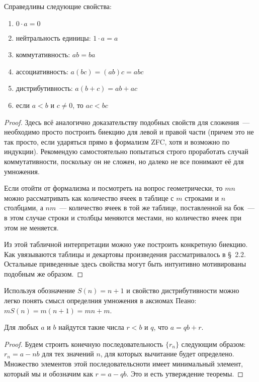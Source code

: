 \begin{thm}
Справедливы следующие свойства:
\begin{enumerate}
\item $0\cdot a = 0$
\item нейтральность единицы: $1\cdot a = a$
\item коммутативность: $ab = ba$
\item ассоциативность: $a(bc) = (ab)c = abc$
\item дистрибутивность: $a(b+c) = ab + ac$
\item если $a < b$ и $c \not= 0$, то $ac < bc$
\end{enumerate}
\end{thm}
\begin{proof}
Здесь всё аналогично доказательству подобных свойств для сложения~--- необходимо просто построить биекцию для левой и правой части (причем это не так просто, если ударяться прямо в формализм ZFC, хотя и возможно по индукции). Рекомендую самостоятельно попытаться строго проработать случай коммутативности, поскольку он не сложен, но далеко не все понимают её для умножения.

Если отойти от формализма и посмотреть на вопрос геометрически, то $mn$ можно рассматривать как количество ячеек в таблице с $m$ строками и $n$ столбцами, а $nm$~--- количество ячеек в той же таблице, поставленной на бок~--- в этом случае строки и столбцы меняются местами, но количество ячеек при этом не меняется.

Из этой табличной интерпретации можно уже построить конкретную биекцию. Как увязываются таблицы и декартовы произведения рассматривалось в \S~2.2. Остальные приведенные здесь свойства могут быть интуитивно мотивированы подобным же образом.
\end{proof}

Используя обозначение $S(n) = n+1$ и свойство дистрибутивности можно легко понять смысл определния умножения в аксиомах Пеано: $mS(n) = m(n+1) = mn + m$.

\begin{thm}
Для любых $a$ и $b$ найдутся такие числа $r<b$ и $q$, что $a = qb + r$.
\end{thm}
\begin{proof}
Будем строить конечную последовательность $\{r_n\}$ следующим образом: $r_n = a - nb$ для тех значений $n$, для которых вычитание будет определено. Множество элементов этой последовательсноти имеет минимальный элемент, который мы и обозначим как $r = a - qb$. Это и есть утверждение теоремы.
\end{proof}

